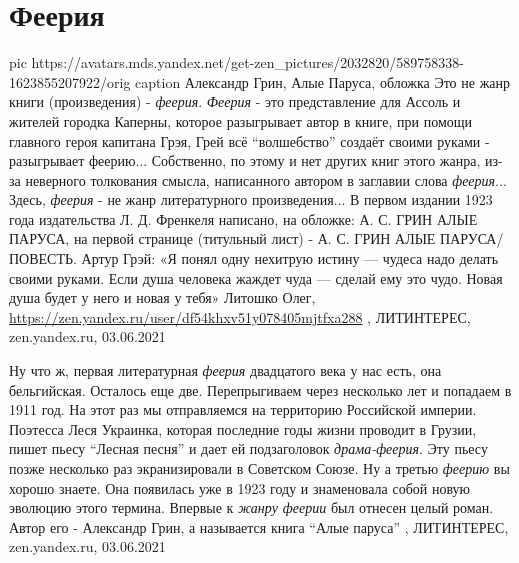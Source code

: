  
 
 
 
 
\chapter{Феерия}

\ifcmt
  pic https://avatars.mds.yandex.net/get-zen_pictures/2032820/589758338-1623855207922/orig
	caption Александр Грин, Алые Паруса, обложка
\fi
Это не жанр книги (произведения) - \emph{феерия}. \emph{Феерия} - это
представление для Ассоль и жителей городка Каперны, которое разыгрывает автор в
книге, при помощи главного героя капитана Грэя, Грей всё \enquote{волшебство}
создаёт своими руками - разыгрывает феерию... Собственно, по этому и нет других
книг этого жанра, из-за неверного толкования смысла, написанного автором в
заглавии слова \emph{феерия}...  Здесь, \emph{феерия} - не жанр литературного
произведения...  В первом издании 1923 года издательства Л. Д. Френкеля
написано, на обложке: А. С. ГРИН АЛЫЕ ПАРУСА, на первой странице (титульный
лист) - А. С. ГРИН АЛЫЕ ПАРУСА/ПОВЕСТЬ.  Артур Грэй: «Я понял одну нехитрую
истину — чудеса надо делать своими руками. Если душа человека жаждет чуда —
сделай ему это чудо. Новая душа будет у него и новая у тебя»
Литошко Олег, \url{https://zen.yandex.ru/user/df54khxv51y078405mjtfxa288}
, 
ЛИТИНТЕРЕС, zen.yandex.ru, 03.06.2021

Ну что ж, первая литературная \emph{феерия} двадцатого века у нас есть, она
бельгийская. Осталось еще две.  Перепрыгиваем через несколько лет и попадаем в
1911 год. На этот раз мы отправляемся на территорию Российской империи.
Поэтесса Леся Украинка, которая последние годы жизни проводит в Грузии, пишет
пьесу \enquote{Лесная песня} и дает ей подзаголовок \emph{драма-феерия}. Эту пьесу позже
несколько раз экранизировали в Советском Союзе.  Ну а третью \emph{феерию} вы хорошо
знаете. Она появилась уже в 1923 году и знаменовала собой новую эволюцию этого
термина. Впервые к \emph{жанру феерии} был отнесен целый роман. Автор его - Александр
Грин, а называется книга \enquote{Алые паруса}
, 
ЛИТИНТЕРЕС, zen.yandex.ru, 03.06.2021

